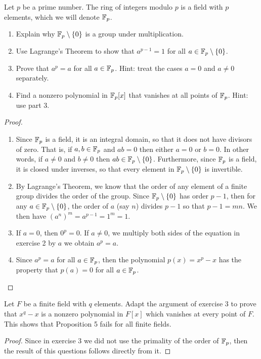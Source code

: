 \begin{exercise}{3}
Let $p$ be a prime number. 
The ring of integers modulo $p$ is a field with $p$ elements, which we will denote $\mathbb{F}_p$.
\begin{enumerate}
    \item Explain why $\mathbb{F}_p \setminus \{0\}$ is a group under multiplication.
    \item Use Lagrange's Theorem to show that $a^{p-1}=1$ for all $a\in \mathbb{F}_p \setminus \{0\}$.
    \item Prove that $a^p=a$ for all $a\in\mathbb{F}_p$. Hint: treat the cases $a=0$ and $a\neq 0$ separately.
    \item Find a nonzero polynomial in $\mathbb{F}_p[x]$ that vanishes at all points of $\mathbb{F}_p$. 
    Hint: use part 3.
\end{enumerate}
\end{exercise}
\begin{proof}
 \begin{enumerate}
     \item Since $\mathbb{F}_p$ is a field, it is an integral domain, so that it does not have divisors of zero. 
     That is, if $a,b\in\mathbb{F}_p$ and $ab=0$ then either $a=0$ or $b=0$. 
     In other words, if $a\neq 0$ and $b\neq 0$ then $ab \in \mathbb{F}_p \setminus\{0\}$.
     Furthermore, since $\mathbb{F}_p$  is a field, it is closed under inverses, so that every element in $\mathbb{F}_p\setminus\{0\}$ is invertible.
     \item By Lagrange's Theorem, we know that the order of any element of a finite group divides the order of the group. 
     Since $\mathbb{F}_p\setminus\{0\}$ has order $p-1$, then for any $a\in\mathbb{F}_p\setminus\{0\}$, the order of $a$ (say $n$) divides $p-1$ so that $p-1=mn$. 
     We then have $(a^n)^m=a^{p-1}=1^m=1$.
     \item If $a=0$, then $0^p=0$. 
     If $a\neq 0$, we multiply both sides of the equation in exercise 2 by $a$ we obtain $a^p=a$.
     \item Since $a^p=a$ for all $a\in\mathbb{F}_p$, then the polynomial $p(x)=x^p-x$ has the property that $p(a)=0$ for all $a\in\mathbb{F}_p$.
 \end{enumerate}
\end{proof}

\begin{exercise}{4}
Let $F$ be a finite field with $q$ elements. 
Adapt the argument of exercise 3 to prove that $x^q-x$ is a nonzero polynomial in $F[x]$ which vanishes at every point of $F$. 
This shows that Proposition 5 fails for all finite fields.
\end{exercise}
\begin{proof}
 Since in exercise 3 we did not use the primality of the order of $\mathbb{F}_p$, then the result of this questions follows directly from it.
\end{proof}

